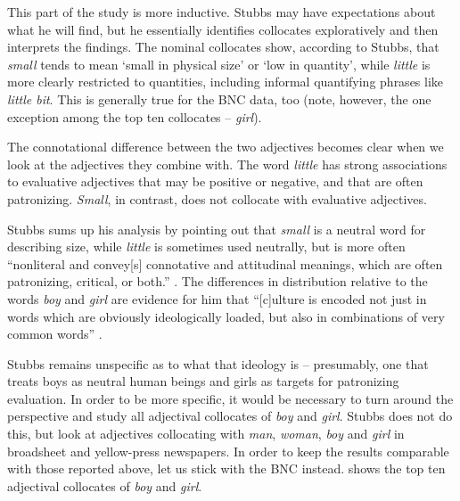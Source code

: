 
This part of the study is more inductive.  Stubbs may have expectations about what he will find, but he essentially identifies collocates  exploratively and then interprets the findings. The nominal  collocates show, according to Stubbs, that \textit{small} tends to mean `small in physical size' or `low in quantity', while \textit{little} is more clearly restricted to quantities, including informal quantifying phrases like \textit{little bit}. This is generally true for the BNC  data, too (note, however, the one exception among the top ten collocates  -- \textit{girl}).

The connotational  difference between the two adjectives  becomes clear when we look at the adjectives  they combine with. The word \textit{little} has strong associations  to evaluative adjectives  that may be positive or negative, and that are often patronizing. \textit{Small}, in contrast, does not collocate  with evaluative  adjectives.

Stubbs sums up his analysis by pointing out that \textit{small} is a neutral word for describing size, while \textit{little} is sometimes used neutrally, but is more often ``nonliteral and convey[s] connotative  and attitudinal meanings,  which are often patronizing, critical, or both.'' \citep[386]{stubbs_collocations_1995-1}. The differences in distribution  relative to the words \textit{boy} and \textit{girl} are evidence for him that ``[c]ulture is encoded not just in words which are obviously ideologically  loaded, but also in combinations of very common words'' \citep[387]{stubbs_collocations_1995-1}.

Stubbs remains unspecific as to what that ideology  is -- presumably, one that treats boys as neutral human beings and girls as targets for patronizing evaluation.  In order to be more specific, it would be necessary to turn around the perspective and study all adjectival  collocates  of \textit{boy} and \textit{girl}. Stubbs does not do this, but \citet{caldas-coulthard_curvy_2010} look at adjectives  collocating with \textit{man}, \textit{woman}, \textit{boy} and \textit{girl} in broadsheet and yellow\hyp{}press newspapers.  In order to keep the results comparable with those reported above, let us stick with the BNC  instead.  shows the top ten adjectival  collocates  of \textit{boy} and \textit{girl}.

